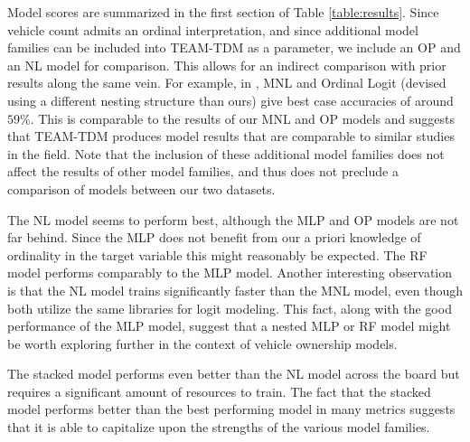 \documentclass[numbered]{trbunofficial}
\begin{document}
Model scores are summarized in the first section of Table \ref{table:results}.
 Since vehicle count admits an ordinal interpretation, and since additional model families can be included into TEAM-TDM as a parameter, we include an OP and an NL model for comparison.
 This allows for an indirect comparison with prior results along the same vein.
 For example, in , MNL and Ordinal Logit (devised using a different nesting structure than ours) give best case accuracies of around $59\%$.
 This is comparable to the results of our MNL and OP models and suggests that TEAM-TDM produces model results that are comparable to similar studies in the field.
 Note that the inclusion of these additional model families does not affect the results of other model families, and thus does not preclude a comparison of models between our two datasets.

The NL model seems to perform best, although the MLP and OP models are not far behind.
 Since the MLP does not benefit from our a priori knowledge of ordinality in the target variable this might reasonably be expected.
 The RF model performs comparably to the MLP model.
 Another interesting observation is that the NL model trains significantly faster than the MNL model, even though both utilize the same libraries for logit modeling.
 This fact, along with the good performance of the MLP model, suggest that a nested MLP or RF model might be worth exploring further in the context of vehicle ownership models.

The stacked model performs even better than the NL model across the board but requires a significant amount of resources to train.
 The fact that the stacked model performs better than the best performing model in many metrics suggests that it is able to capitalize upon the strengths of the various model families.
\end{document}
